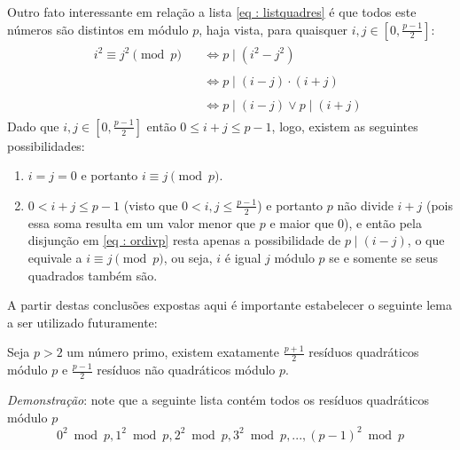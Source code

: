 Outro fato interessante em relação a lista \ref{eq : listquadres} é que todos este números são distintos em módulo $p$, haja vista, para quaisquer $i, j \in \left[0, \frac{p-1}{2}\right]$:
\begin{align}
    i^2 \equiv j^2 \pmod p
    &\begin{aligned}
        \;\; \Longleftrightarrow p \mid (i^2 - j^2)
    \end{aligned} \\
    &\begin{aligned}
        \;\; \Longleftrightarrow p \mid (i - j)\cdot(i + j)
    \end{aligned} \\
    &\begin{aligned} \label{eq : ordivp}
        \;\; \Longleftrightarrow p \mid (i - j) \lor p \mid (i + j)
    \end{aligned} 
\end{align}
Dado que $i, j \in \left[0, \frac{p-1}{2}\right]$ então $0 \leq i + j \leq p - 1$, logo, existem as seguintes possibilidades:
\begin{enumerate}
    \item $i = j = 0$ e portanto $i \equiv j \pmod p$.
    \item $0 < i + j \leq p-1$ (visto que $0 < i, j \leq \frac{p-1}{2}$) e portanto $p$ não divide $i + j$ (pois essa soma resulta em um valor menor que $p$ e maior que $0$), e então pela disjunção em \ref{eq : ordivp} resta apenas a possibilidade de $p \mid (i - j)$, o que equivale a $i \equiv j \pmod p$, ou seja, $i$ é igual $j$ módulo $p$ se e somente se seus quadrados também são.
\end{enumerate}
\noindent
A partir destas conclusões expostas aqui é importante estabelecer o seguinte lema a ser utilizado futuramente:
\begin{lema} \label{lema:existnonquadratic}
    Seja $p > 2$ um número primo, existem exatamente $\frac{p+1}{2}$ resíduos quadráticos módulo $p$ e $\frac{p-1}{2}$ resíduos não quadráticos módulo $p$.
\end{lema}
\noindent
\textit{Demonstração}: note que a seguinte lista contém todos os resíduos quadráticos módulo $p$
\begin{equation*}
    0^2 \bmod{p}, 1^2 \bmod{p}, 2^2 \bmod{p}, 3^2 \bmod{p}, ..., (p - 1)^2 \bmod{p}
\end{equation*}
